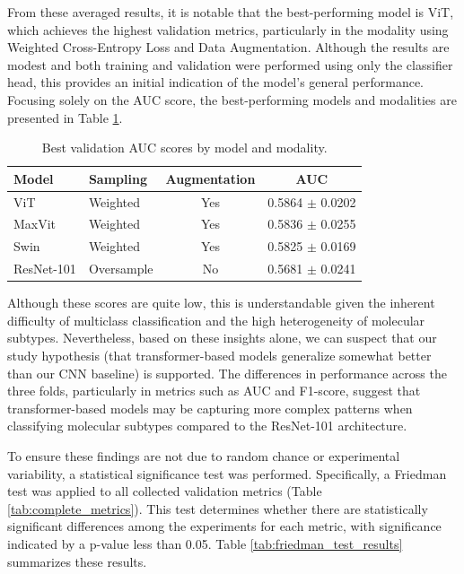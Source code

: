 \documentclass[a4paper,10pt]{book}
\begin{document}
From these averaged results, it is notable that the best-performing model is ViT, which achieves the highest validation metrics, particularly in the modality using Weighted Cross-Entropy Loss and Data Augmentation. Although the results are modest and both training and validation were performed using only the classifier head, this provides an initial indication of the model's general performance. Focusing solely on the AUC score, the best-performing models and modalities are presented in Table \ref{tab:best_auc_modalities_validation}.

\begin{table}[h!]
  \centering
\caption[Best validation AUC scores by model and modality.]{Best validation AUC scores by model and modality.}
  \label{tab:best_auc_modalities_validation}
  \begin{tabular}{l l c c}
    \toprule
    \textbf{Model} & \textbf{Sampling} & \textbf{Augmentation} & \textbf{AUC} \\ 
    \midrule
    ViT & Weighted & Yes & 0.5864  $\pm$ 0.0202   \\
    MaxVit  & Weighted & Yes  & 0.5836 $\pm$  0.0255 \\
    Swin    & Weighted & Yes  & 0.5825 $\pm$  0.0169 \\
    ResNet-101    & Oversample & No & 0.5681 $\pm$  0.0241 \\
    \bottomrule
  \end{tabular}
\end{table}


Although these scores are quite low, this is understandable given the inherent difficulty of multiclass classification and the high heterogeneity of molecular subtypes. Nevertheless, based on these insights alone, we can suspect that our study hypothesis (that transformer-based models generalize somewhat better than our CNN baseline) is supported. The differences in performance across the three folds, particularly in metrics such as AUC and F1-score, suggest that transformer-based models may be capturing more complex patterns when classifying molecular subtypes compared to the ResNet-101 architecture.

To ensure these findings are not due to random chance or experimental variability, a statistical significance test was performed. Specifically, a Friedman test was applied to all collected validation metrics (Table \ref{tab:complete_metrics}). This test determines whether there are statistically significant differences among the experiments for each metric, with significance indicated by a p-value less than 0.05. Table \ref{tab:friedman_test_results} summarizes these results.
\end{document}
